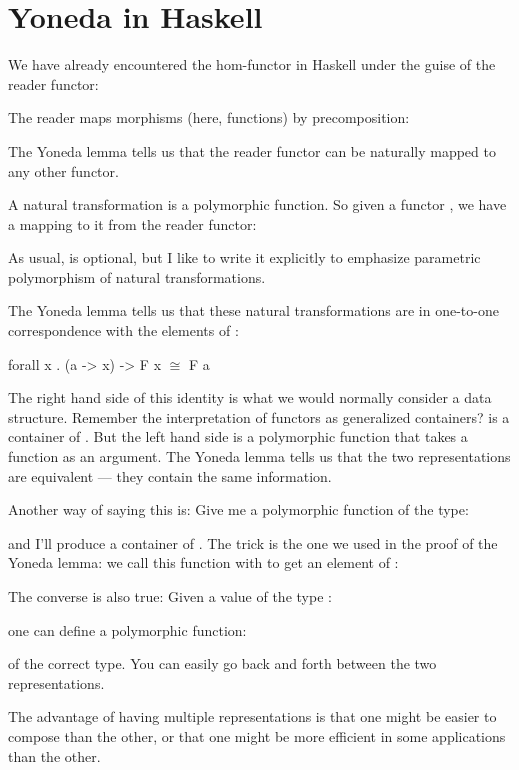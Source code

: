 \section{Yoneda in Haskell}

We have already encountered the hom-functor in Haskell under the guise
of the reader functor:

The reader maps morphisms (here, functions) by precomposition:

The Yoneda lemma tells us that the reader functor can be naturally
mapped to any other functor.

A natural transformation is a polymorphic function. So given a functor
, we have a mapping to it from the reader functor:

As usual,  is optional, but I like to write it explicitly
to emphasize parametric polymorphism of natural transformations.

The Yoneda lemma tells us that these natural transformations are in
one-to-one correspondence with the elements of :

\begin{snipv}
forall x . (a -> x) -> F x \ensuremath{\cong} F a
\end{snipv}
The right hand side of this identity is what we would normally consider
a data structure. Remember the interpretation of functors as generalized
containers?  is a container of . But the left
hand side is a polymorphic function that takes a function as an
argument. The Yoneda lemma tells us that the two representations are
equivalent --- they contain the same information.

Another way of saying this is: Give me a polymorphic function of the
type:

and I'll produce a container of . The trick is the one we used
in the proof of the Yoneda lemma: we call this function with 
to get an element of :

The converse is also true: Given a value of the type :

one can define a polymorphic function:

of the correct type. You can easily go back and forth between the two
representations.

The advantage of having multiple representations is that one might be
easier to compose than the other, or that one might be more efficient in
some applications than the other.

